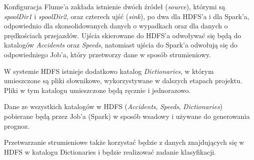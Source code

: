\documentclass{article}
\begin{document}
Konfiguracja Flume’a zakłada istnienie dwóch źródeł (\textit{source}), którymi są \textit{spoolDir1} i \textit{spoolDir2}, oraz czterech ujść (\textit{sink}), po dwa dla HDFS’a i dla Spark’a, odpowiednio dla skonsolidowanych danych o wypadkach oraz dla danych o prędkościach przejazdów. Ujścia skierowane do HDFS’a odwoływać się będą do katalogów \textit{Accidents} oraz \textit{Speeds}, natomiast ujścia do Spark’a odwołują się do odpowiedniego Job’a, który przetworzy dane w sposób strumieniowy.

W systemie HDFS istnieje dodatkowo katalog \textit{Dictionaries}, w którym umieszczone są pliki słownikowe, wykorzystywane w dalszych etapach projektu. Pliki w tym katalogu umieszczone będą ręcznie i jednorazowo.  

Dane ze wszystkich katalogów w HDFS (\textit{Accidents}, \textit{Speeds}, \textit{Dictionaries}) pobierane będą przez Job’a (Spark) w sposób wsadowy i używane do generowania prognoz.

Przetwarzanie strumieniowe także korzystać będzie z danych znajdujących się w HDFS w katalogu Dictionaries i będzie realizować zadanie klasyfikacji.
\end{document}
